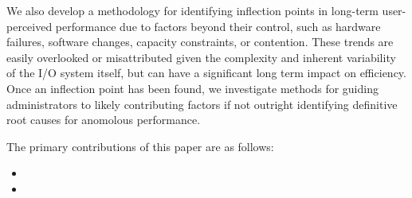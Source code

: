 We also develop a methodology for identifying inflection points in
long-term user-perceived performance due to factors beyond their control,
such as hardware failures, software changes, capacity constraints, or
contention.  These trends are easily overlooked or misattributed given the
complexity and inherent variability of the I/O system itself, but can have a
significant long term impact on efficiency.  Once an inflection point has
been found, we investigate methods for guiding administrators to likely
contributing factors if not outright identifying definitive root causes for
anomolous performance.


The primary contributions of this paper are as follows:
\begin{itemize}
\item {}
\item {}
\end{itemize}


